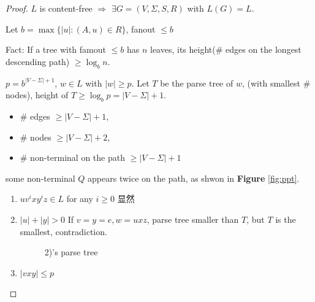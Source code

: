 \begin{proof}
    $L$ is content-free $\Rightarrow$ $\exists G=(V,\Sigma, S,R)$ with $L(G)=L$. 

    Let $b=\max\{ |u|: (A,u)\in R \}$, fanout $\le b$

    Fact: If a tree with famout $\le b$ has $n$ leaves, its height(\# edges on the longest descending path) $\ge \log_b n$. 

    $p=b^{|V-\Sigma|+1}$, $w\in L$ with $|w|\ge p$. Let $T$ be the parse tree of $w$, (with smallest \# nodes), height of $T\ge \log_b p=|V-\Sigma|+1$. 
    \begin{itemize}
        \item \# edges $\ge |V-\Sigma|+1$, 
        \item \# nodes $\ge |V-\Sigma|+2$, 
        \item \# non-terminal on the path $\ge |V-\Sigma|+1$
    \end{itemize}
    some non-terminal $Q$ appears twice on the path, as shwon in \textbf{Figure} \ref{fig:ppt}. 
    \begin{enumerate}
        \item $uv^ixy^iz\in L$ for any $i\ge 0$ 显然
        \item $|u|+|y|>0$
        \subitem If $v=y=e, w=uxz$, parse tree smaller than $T$, but $T$ is the smallest, contradiction. 
        \begin{figure}[!htb]
            \centering
            \caption{2)'s parse tree}
        \end{figure}
        \item $|vxy|\le p$ 
        \begin{figure}[!htb]
            \centering
\end{figure}
\end{enumerate}
\end{proof}
